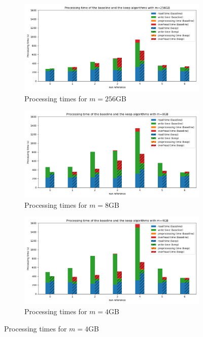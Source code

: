 \documentclass[sigconf, nonacm]{acmart}
\begin{document}
{\begin{figure}
     \centering
     \begin{subfigure}[b]{\textwidth}
         \centering
         \includegraphics[scale=0.5]{./figures/new/results_256.png}
         \caption{Processing times for $m=256$GB}
         \label{fig:results256}
     \end{subfigure}
     \vfill
     \begin{subfigure}[b]{\textwidth}
         \centering
         \includegraphics[scale=0.5]{./figures/new/results_8.png}
         \caption{Processing times for $m=8$GB}
         \label{fig:results8}
     \end{subfigure}
     \vfill
     \begin{subfigure}[b]{\textwidth}
         \centering
         \includegraphics[scale=0.5]{./figures/new/results_4.png}
         \caption{Processing times for $m=4$GB}
         \label{fig:results4}
     \end{subfigure}


\end{figure}}
\end{document}
